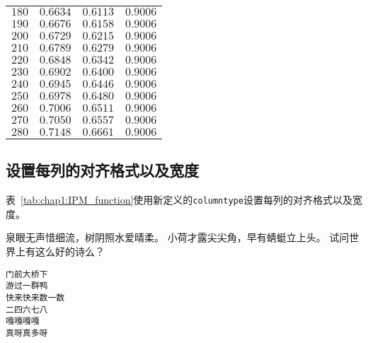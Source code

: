 \begin{center}
\begin{supertabular}{C{3cm}C{3cm}C{3cm}C{3cm}}
    $180$                    & $0.6634$              & $0.6113$             & $0.9006$       \\

    $190$                    & $0.6676$              & $0.6158$             & $0.9006$       \\

    $200$                    & $0.6729$              & $0.6215$             & $0.9006$       \\

    $210$                    & $0.6789$              & $0.6279$             & $0.9006$       \\

    $220$                    & $0.6848$              & $0.6342$             & $0.9006$       \\

    $230$                    & $0.6902$              & $0.6400$             & $0.9006$      \\

    $240$  & $0.6945$& $0.6446$  & $0.9006$\\

    $250$  & $0.6978$& $0.6480$  & $0.9006$\\

    $260$  & $0.7006$& $0.6511$  & $0.9006$\\

    $270$  & $0.7050$& $0.6557$  & $0.9006$  \\

    $280$  & $0.7148$& $0.6661$  & $0.9006$  \\
  \end{supertabular}
\end{center}

\subsection{设置每列的对齐格式以及宽度}
表~\ref{tab:chap1:IPM_function}使用新定义的\texttt{columntype}设置每列的对齐格式以及宽度。

泉眼无声惜细流，树阴照水爱晴柔。
小荷才露尖尖角，早有蜻蜓立上头。
试问世界上有这么好的诗么？

\begin{verbatim}
门前大桥下
游过一群鸭
快来快来数一数
二四六七八
嘎嘎嘎嘎
真呀真多呀
\end{verbatim}

